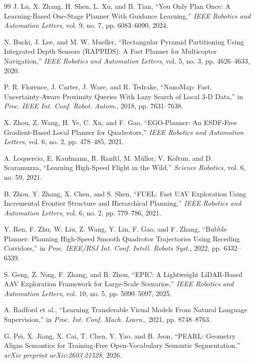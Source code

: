 \documentclass[letterpaper,10pt,conference]{ieeeconf}
\begin{document}
{\footnotesize
\begin{thebibliography}{99}
J. Lu, X. Zhang, H. Shen, L. Xu, and B. Tian,
``You Only Plan Once: A Learning-Based One-Stage Planner With Guidance Learning,''
\emph{IEEE Robotics and Automation Letters}, vol. 9, no. 7,
pp. 6083--6090, 2024.

N. Bucki, J. Lee, and M. W. Mueller,
``Rectangular Pyramid Partitioning Using Integrated Depth Sensors (RAPPIDS): A Fast Planner for Multicopter Navigation,''
\emph{IEEE Robotics and Automation Letters}, vol. 5, no. 3,
pp. 4626--4633, 2020.

P. R. Florence, J. Carter, J. Ware, and R. Tedrake,
``NanoMap: Fast, Uncertainty-Aware Proximity Queries With Lazy Search of Local 3-D Data,''
in \emph{Proc. IEEE Int. Conf. Robot. Autom.}, 2018, pp. 7631--7638.

X. Zhou, Z. Wang, H. Ye, C. Xu, and F. Gao,
``EGO-Planner: An ESDF-Free Gradient-Based Local Planner for Quadrotors,''
\emph{IEEE Robotics and Automation Letters}, vol. 6, no. 2,
pp. 478--485, 2021.

A. Loquercio, E. Kaufmann, R. Ranftl, M. M\"uller, V. Koltun, and D. Scaramuzza,
``Learning High-Speed Flight in the Wild,''
\emph{Science Robotics}, vol. 6, no. 59, 2021.

B. Zhou, Y. Zhang, X. Chen, and S. Shen,
``FUEL: Fast UAV Exploration Using Incremental Frontier Structure and Hierarchical Planning,''
\emph{IEEE Robotics and Automation Letters}, vol. 6, no. 2,
pp. 779--786, 2021.

Y. Ren, F. Zhu, W. Liu, Z. Wang, Y. Lin, F. Gao, and F. Zhang,
``Bubble Planner: Planning High-Speed Smooth Quadrotor Trajectories Using Receding Corridors,''
in \emph{Proc. IEEE/RSJ Int. Conf. Intell. Robots Syst.}, 2022,
pp. 6332--6339.

S. Geng, Z. Ning, F. Zhang, and B. Zhou,
``EPIC: A Lightweight LiDAR-Based AAV Exploration Framework for Large-Scale Scenarios,''
\emph{IEEE Robotics and Automation Letters}, vol. 10, no. 5,
pp. 5090--5097, 2025.

A. Radford et al.,
``Learning Transferable Visual Models From Natural Language Supervision,''
in \emph{Proc. Int. Conf. Mach. Learn.}, 2021, pp. 8748--8763.

G. Pei, X. Jiang, X. Cai, T. Chen, Y. Yao, and B. Jeon,
``PEARL: Geometry Aligns Semantics for Training-Free Open-Vocabulary Semantic Segmentation,''
\emph{arXiv preprint arXiv:2603.21528}, 2026.


\end{thebibliography}}
\end{document}
